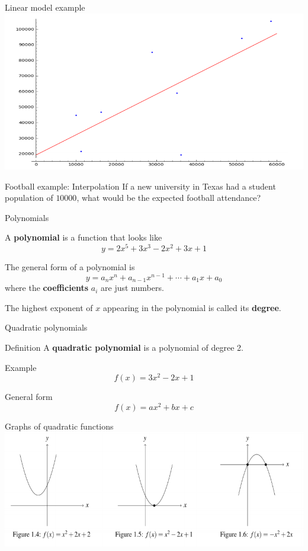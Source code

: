 \documentclass[t]{beamer}
\newenvironment{fpi}
  {\itemize[nolistsep,itemsep=\fill]}
  {\vfill\enditemize}
\begin{document}
\begin{frame}{Linear model example}
\vfill
\includegraphics[width=\textwidth]{football2}
\vfill
\end{frame}

\begin{frame}{Football example: Interpolation}
If a new university in Texas had a student population of
$10000$, what would be the expected football attendance?
\end{frame}

\begin{frame}{Polynomials}
\begin{fpi}
\item A \textbf{polynomial} is a function that looks like
$$y = 2x^5 + 3x^3 -2x^2 + 3x + 1$$
\item The general form of a polynomial is
$$y = a_n x^n + a_{n-1} x^{n-1} + \cdots + a_1 x + a_0$$
where the \textbf{coefficients} $a_i$ are just numbers.  
\item The highest 
exponent of $x$ appearing in the polynomial is called its \textbf{degree}.
\end{fpi}
\end{frame}

\begin{frame}{Quadratic polynomials}
\begin{block}{Definition}
A \textbf{quadratic polynomial} is a polynomial of degree 2.
\end{block}
\begin{block}{Example}
$$f(x) = 3x^2 - 2x + 1$$
\end{block}
\begin{block}{General form}
$$f(x) = ax^2 + bx + c$$
\end{block}
\end{frame}

\begin{frame}{Graphs of quadratic functions}
\vfill
\includegraphics[width=\textwidth]{quadratic}
\vfill
\end{frame}
\end{document}
